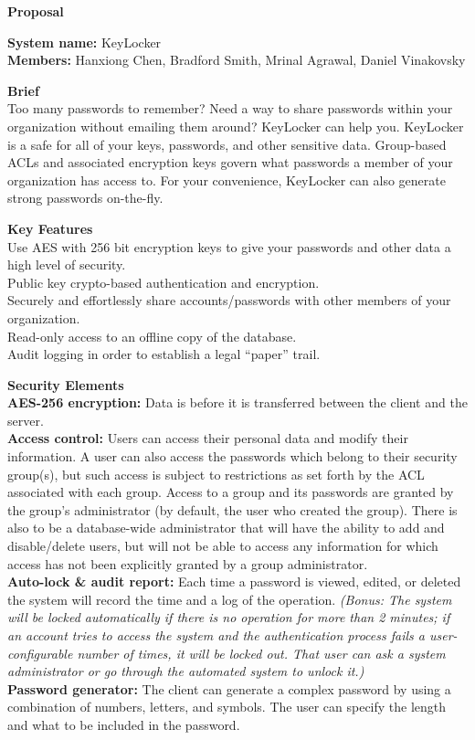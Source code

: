 \documentclass[11pt, letterpaper]{article}
\newcommand{\ProposalSection}[1]
{\noindent\textbf{#1}\\}
\newcommand{\IndentBullet}[1]
{\indent\textbullet{} #1\\}
\begin{document}
\centerline{\textbf{Proposal}}
\smallskip
\noindent\textbf{System name: }KeyLocker\\
\noindent\textbf{Members: }Hanxiong Chen, Bradford Smith, Mrinal Agrawal, Daniel Vinakovsky\\
\bigskip

\ProposalSection{Brief}
\noindent
Too many passwords to remember? Need a way to share passwords within your organization without emailing them around? KeyLocker can help you. KeyLocker is a safe for all of your keys, passwords, and other sensitive data. Group-based ACLs and associated encryption keys govern what passwords a member of your organization has access to. For your convenience, KeyLocker can also generate strong passwords on-the-fly.
\bigskip

\ProposalSection{Key Features}
\IndentBullet{Use AES with 256 bit encryption keys to give your passwords and other data a high level of security.}
\IndentBullet{Public key crypto-based authentication and encryption.}
\IndentBullet{Securely and effortlessly share accounts/passwords with other members of your organization.}
\IndentBullet{Read-only access to an offline copy of the database.}
\IndentBullet{Audit logging in order to establish a legal “paper” trail.}
\bigskip

\ProposalSection{Security Elements}
\IndentBullet{\textbf{AES-256 encryption: }Data is before it is transferred between the client and the server.}
\IndentBullet{\textbf{Access control: }Users can access their personal data and modify their information. A user can also access the passwords which belong to their security group(s), but such access is subject to restrictions as set forth by the ACL associated with each group. Access to a group and its passwords are granted by the group’s administrator (by default, the user who created the group). There is also to be a database-wide administrator that will have the ability to add and disable/delete users, but will not be able to access any information for which access has not been explicitly granted by a group administrator.}
\IndentBullet{\textbf{Auto-lock \& audit report: }Each time a password is viewed, edited, or deleted the system will record the time and a log of the operation. \textit{(Bonus: The system will be locked automatically if there is no operation for more than 2 minutes; if an account tries to access the system and the authentication process fails a user-configurable number of times, it will be locked out. That user can ask a system administrator or go through the automated system to unlock it.)}}
\IndentBullet{\textbf{Password generator: }The client can generate a complex password by using a combination of numbers, letters, and symbols. The user can specify the length and what to be included in the password.}
\bigskip
\end{document}
